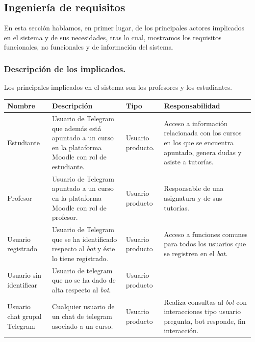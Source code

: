 \chapter{}


\section{Ingeniería de requisitos}

En esta sección hablamos, en primer lugar, de los principales actores implicados en el sistema y de sus necesidades, tras lo cual, mostramos los requisitos funcionales, no funcionales y de información del sistema.

\subsection{Descripción de los implicados.}

Los principales implicados en el sistema son los profesores y los estudiantes.

\begin{tabular}{|p{3cm}|p{4cm}|p{2cm}|p{6cm}|}
\hline
{\bf Nombre } & {\bf Descripción } & {\bf Tipo } & {\bf  Responsabilidad}\\
\hline
{ Estudiante } & { Usuario de Telegram que además está apuntado a un curso en la plataforma Moodle con rol de estudiante.} & { Usuario producto. } & { Acceso a información relacionada con los cursos en los que se encuentra apuntado, genera dudas y  asiste a tutorías.} \\
\hline
{ Profesor } & {  Usuario de Telegram apuntado a un curso en la plataforma Moodle con rol de profesor.} & { Usuario producto } & { Responsable de una asignatura y de sus tutorías.} \\
\hline
{ Usuario registrado } & {  Usuario de Telegram que se ha identificado respecto al \textit{bot} y éste lo tiene registrado.} & { Usuario producto } & { Acceso a funciones comunes para todos los usuarios que se registren en el \textit{bot}. } \\
\hline
{ Usuario sin identificar } & {  Usuario de telegram que no se ha dado de alta respecto al \textit{bot}.} & { Usuario producto } & { } \\
\hline
{ Usuario chat grupal Telegram} & {  Cualquier usuario de un chat de telegram asociado a un curso.} & { Usuario producto } & { Realiza consultas al \textit{bot} con interacciones tipo usuario pregunta, bot responde, fin interacción.} \\
\hline

\end{tabular}



